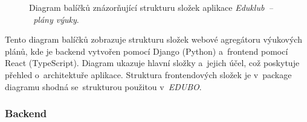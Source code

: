 \documentclass[male,czech,api_bc]{kitheses}
\begin{document}
\begin{figure}[H]
	\centering
	\caption{Diagram balíčků znázorňující strukturu složek aplikace \textit{Eduklub~--~plány výuky}.}
	\label{fig:package-diagram-2}
\end{figure}

Tento diagram balíčků zobrazuje strukturu složek webové agregátoru výukových plánů, kde je backend vytvořen pomocí Django (Python) a~frontend pomocí React (TypeScript). Diagram ukazuje hlavní složky a~jejich účel, což poskytuje přehled o~architektuře aplikace. Struktura frontendových složek je v~package diagramu shodná se~strukturou použitou v~\textit{EDUBO}.

\subsubsection{Backend}
\end{document}

